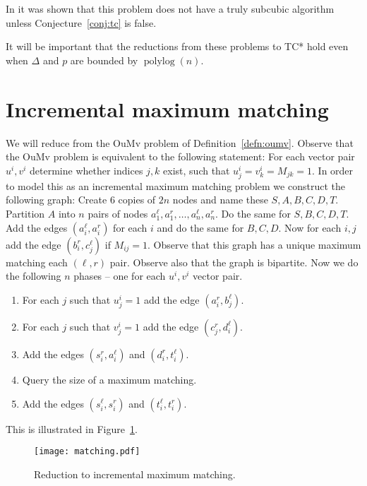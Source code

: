 \documentclass[a4paper,11pt]{article}
\def\polylog{\operatorname{polylog}}
\theoremstyle{definition}
\begin{document}
In \cite{AbboudVY15} it was shown that this problem does not have a truly
subcubic algorithm unless Conjecture~\ref{conj:tc} is false.

It will be important that the reductions from these problems to TC* hold even
when $\Delta$ and $p$ are bounded by $\polylog(n)$.

\section{Incremental maximum matching}
We will reduce from the OuMv problem of Definition~\ref{defn:oumv}.
Observe that the OuMv problem is equivalent to the following statement:
For each vector pair $u^i,v^i$ determine whether indices $j,k$ exist, such that
$u^i_j = v^i_k = M_{jk} = 1$. In order to model this as an incremental maximum
matching problem we construct the following graph:
Create $6$ copies of $2n$ nodes and name these $S, A, B, C, D, T$.
Partition $A$ into $n$ pairs of nodes $a^\ell_1, a^r_1, \ldots, a^\ell_n,
a^r_n$. Do the same for $S, B, C, D, T$. Add the edges $(a^\ell_i, a^r_i)$ for
each $i$ and do the same for $B, C, D$. Now for each $i,j$ add the edge $(b^r_i,
c^\ell_j)$ if $M_{ij} = 1$. Observe that this graph has a unique maximum
matching each $(\ell,r)$ pair. Observe also that the graph is bipartite.
Now we do the following $n$ phases -- one for each $u^i,v^i$ vector pair.
\begin{enumerate}
    \item For each $j$ such that $u^i_j = 1$ add the edge $(a_i^r,
        b^\ell_j)$.
    \item For each $j$ such that $v^i_j = 1$ add the edge
        $(c_j^r,d_i^\ell)$.
    \item Add the edges $(s^r_i,a^\ell_i)$ and $(d^r_i,t^\ell_i)$.
    \item Query the size of a maximum matching.
    \item Add the edges $(s^\ell_i,s^r_i)$ and $(t^\ell_i,t^r_i)$.
\end{enumerate}
This is illustrated in Figure~\ref{fig:matching}.

\begin{figure}[htbp]
    \centering
    \texttt{[image: matching.pdf]}
    \caption{Reduction to incremental maximum matching.}
    \label{fig:matching}
\end{figure}
\end{document}
